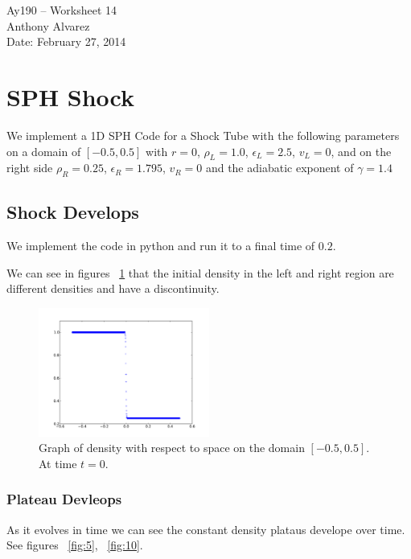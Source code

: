 \documentclass[11pt,letterpaper]{article}
\begin{document}
\begin{center}
\Large
Ay190 -- Worksheet 14\\
Anthony Alvarez\\
Date: February 27, 2014
\end{center}

\section{SPH Shock}

We implement a 1D SPH Code for a Shock Tube with the following parameters on a 
domain of $[-0.5,0.5]$ with
$r= 0$, $\rho_L = 1.0$, $\epsilon_L = 2.5$, $v_L = 0$, and on the right side
$\rho_R = 0.25$, $\epsilon_R = 1.795$, $v_R= 0$ and the adiabatic exponent of 
$\gamma = 1.4$ 

\subsection{Shock Develops}

We implement the code in python and run it to a final time of $0.2$. 

We can see in figures ~\ref{fig:0} that the initial density in the left and 
right region are different densities and have a discontinuity. 

\begin{figure}[bth]
\centering
\includegraphics[width=0.5\textwidth]{0.pdf}
\caption{Graph of density with respect to space on the domain 
$[-0.5,0.5]$. At time $t = 0$.}
\label{fig:0}
\end{figure}

\subsubsection{Plateau Devleops}

As it evolves in time we can see the constant density plataus 
develope over time. See figures ~\ref{fig:5}, ~\ref{fig:10}.
\end{document}
